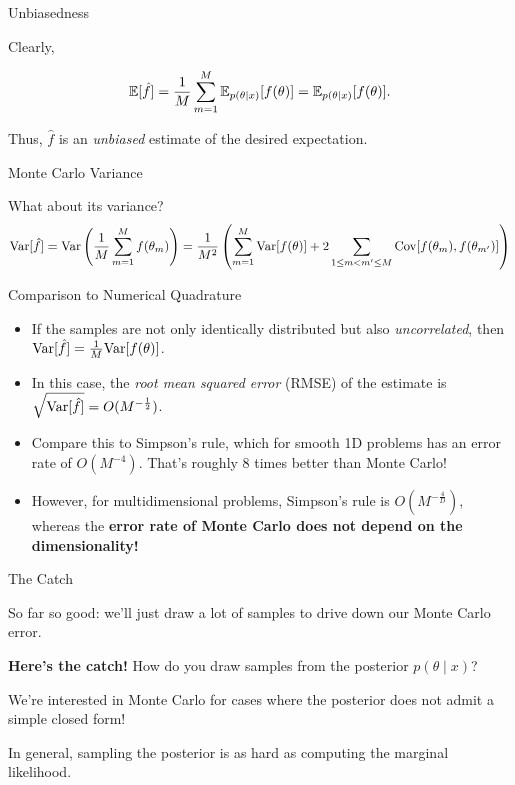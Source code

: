 \documentclass[aspectratio=169]{beamer}
\begin{document}
\begin{frame}[t,allowframebreaks]{Unbiasedness}\label{unbiasedness}

Clearly,

\begin{align*}
\mathbb{E}[\hat{f}] = \frac{1}{M} \sum_{m=1}^M \mathbb{E}_{p(\theta | x)}[f(\theta)] = \mathbb{E}_{p(\theta | x)}[f(\theta)].
\end{align*}

Thus, \(\hat{f}\) is an \emph{unbiased} estimate of the desired
expectation.
\end{frame}

\begin{frame}[t,allowframebreaks]{Monte Carlo Variance}\label{monte-carlo-variance}

What about its variance? \begin{align*}
\textrm{Var}[\hat{f}] = \textrm{Var} \left(\frac{1}{M} \sum_{m=1}^M f(\theta_m) \right) = \frac{1}{M^2} \left( \sum_{m=1}^M \textrm{Var}[f(\theta)] + 2 \sum_{1 \leq m < m' \leq M} \mathrm{Cov} [f(\theta_m), f(\theta_{m'})] \right)
\end{align*}
\end{frame}

\begin{frame}[t,allowframebreaks]{Comparison to Numerical
Quadrature}\label{comparison-to-numerical-quadrature}

\begin{itemize}
\item
  If the samples are not only identically distributed but also
  \emph{uncorrelated}, then
  \(\textrm{Var}[\hat{f}] = \frac{1}{M} \textrm{Var}[f(\theta)]\).
\item
  In this case, the \emph{root mean squared error} (RMSE) of the
  estimate is \(\sqrt{\textrm{Var}[\hat{f}]} = O(M^{-\frac{1}{2}})\).
\item
  Compare this to Simpson's rule, which for smooth 1D problems has an
  error rate of \(O(M^{-4})\). That's roughly 8 times better than Monte
  Carlo!
\item
  However, for multidimensional problems, Simpson's rule is
  \(O(M^{-\frac{4}{D}})\), whereas the \textbf{error rate of Monte Carlo
  does not depend on the dimensionality!}
\end{itemize}
\end{frame}

\begin{frame}[t,allowframebreaks]{The Catch}\label{the-catch}

So far so good: we'll just draw a lot of samples to drive down our Monte
Carlo error. 

\textbf{Here's the catch!} How do you draw samples from the
posterior \(p(\theta \mid x)\)? 

We're interested in Monte Carlo for
cases where the posterior does not admit a simple closed form! 

In general, sampling the posterior is as hard as computing the marginal
likelihood.
\end{frame}
\end{document}
